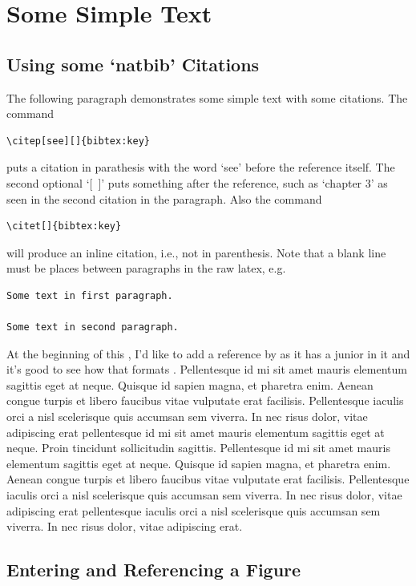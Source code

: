 \chapter{Some Simple Text}

\section{Using some `natbib' Citations}

The following paragraph demonstrates some simple text with some citations. The
command
\begin{verbatim}
\citep[see][]{bibtex:key}
\end{verbatim}
puts a citation in parathesis with the word `see' before the
reference itself. The second optional `[~]' puts something after the reference,
such as `chapter 3' as seen in the second citation in the paragraph. Also the
command
\begin{verbatim}
\citet[]{bibtex:key}
\end{verbatim}
will produce an inline citation, i.e., not in parenthesis. Note that a blank
line must be places between paragraphs in the raw latex, e.g.
\begin{verbatim}
Some text in first paragraph.

Some text in second paragraph.
\end{verbatim}

At the beginning of this \citep{Yu2011}, I'd like to add a reference by \citet{Afjeh:1986:JoFE}
as it has a junior in it and it's good to \citep{Fachinetti2013} see how that formats \cite{Marston2004}. Pellentesque id
mi sit amet mauris elementum \citep{Akiyoshi2004} sagittis eget at neque. Quisque id sapien magna, et
pharetra enim. Aenean congue turpis et libero faucibus vitae vulputate erat
facilisis. Pellentesque iaculis orci a nisl scelerisque quis accumsan sem
viverra. In nec risus dolor, vitae adipiscing erat
\citep[see][]{Solomon:2007:CUP} pellentesque id mi sit amet mauris elementum
sagittis eget at neque. Proin tincidunt sollicitudin sagittis. Pellentesque id
mi sit amet mauris elementum sagittis eget at neque. Quisque id sapien magna, et
pharetra enim. Aenean congue turpis et libero faucibus vitae vulputate erat
facilisis. Pellentesque iaculis orci a nisl scelerisque quis accumsan sem
viverra. In nec risus dolor, vitae adipiscing erat
\citep[see][]{Jaccard:2005:CUP} pellentesque iaculis orci a nisl scelerisque
quis accumsan sem viverra. In nec risus dolor, vitae adipiscing erat.

\section{Entering and Referencing a Figure}

